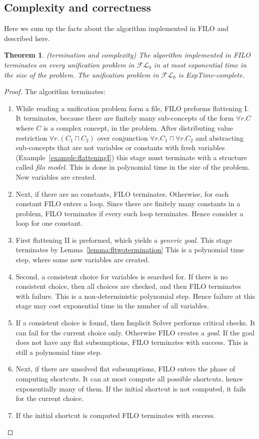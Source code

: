 \documentclass{article}
\newtheorem{theorem}{Theorem}
\newcommand{\flo}{\ensuremath{\mathcal{FL}_0}\xspace}
\begin{document}
	\subsection{Complexity and correctness}
	
	Here we sum up the facts about the algorithm implemented in
	FILO and described here.
	
	\begin{theorem}(termination and complexity)
	The algorithm implemented in FILO terminates on every unification problem in \flo in at most exponential time in the size of the problem.
	The unification problem in \flo is ExpTime-complete.
	\end{theorem}
	\begin{proof}
		The algorithm terminates:
		\begin{enumerate}
			\item While reading a unification problem form a file, FILO preforms flattening I. It terminates, because there are finitely many
			sub-concepts of the form $\forall r.C$ where $C$ is a complex concept, in the problem. After distributing value restriction $\forall r.(C_1 \sqcap C_2)$ over
			conjunction $\forall r.C_1 \sqcap \forall r.C_2$ and  abstracting  sub-concepts that are not variables or constants with fresh variables (Example~\ref{example:flatteningI}) this stage must terminate with a structure
			called \emph{filo model}. This is done in polynomial time in the size of the problem. New variables are created.
			\item Next, if there are no constants, FILO terminates. Otherwise, for each constant FILO enters a loop. Since there are finitely many constants
			in a problem, FILO terminates if every such loop terminates. Hence consider a loop for one constant.
			\item  First flattening II is preformed, which yields a \emph{generic goal}.
			This stage terminates by Lemma~\ref{lemma:fltwotermination} This is a polynomial time step, where some new variables are created.
			\item Second, a consistent choice  for variables is searched for. If there is no consistent choice, then
			all choices are checked, and then FILO terminates with failure. This is a non-deterministic polynomial step. Hence
			failure at this stage may cost exponential time in the number of all variables.
			\item If a consistent choice is found, then Implicit Solver performs critical checks. It can fail for the current choice only.
			Otherwise FILO creates a \emph{goal}. If the goal does not have any flat subsumptions, FILO terminates with success.
			This is still a polynomial time step.
			\item Next, if there are unsolved flat subsumptions, FILO enters the phase of computing shortcuts.
			It can at most compute all possible shortcuts, hence exponentially many of them. If the initial shortcut is not computed,
			it fails for the current choice. 
			\item If the initial shortcut is computed FILO terminates with success.
		\end{enumerate}
		

\end{proof}
\end{document}
